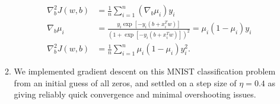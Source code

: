 \documentclass[11pt,letterpaper]{article}
\numberwithin{equation}{section}
\numberwithin{figure}{section}
\begin{document}
\begin{enumerate}
\begin{enumerate}
\begin{align*}
			\nabla^2_b J(w,b) &= \frac{1}{n} \sum_{i=1}^n (\nabla_b \mu_i) y_i\\
			\nabla_b \mu_i &= \frac{y_i \exp\left[-y_i(b+x_i^T w)\right]}{\left(1+\exp\left[-y_i(b+x_i^T w)\right]\right)^2} = \mu_i(1-\mu_i)y_i\\
			\nabla^2_b J(w,b) &= \frac{1}{n} \sum_{i=1}^n \mu_i(1-\mu_i) y_i^2.
		\end{align*}

















		\item We implemented gradient descent on this MNIST classification problem from an initial guess of all zeros, and settled on a step size of $\eta = 0.4$ as giving reliably quick convergence and minimal overshooting issues.


\end{enumerate}
\end{enumerate}
\end{document}
